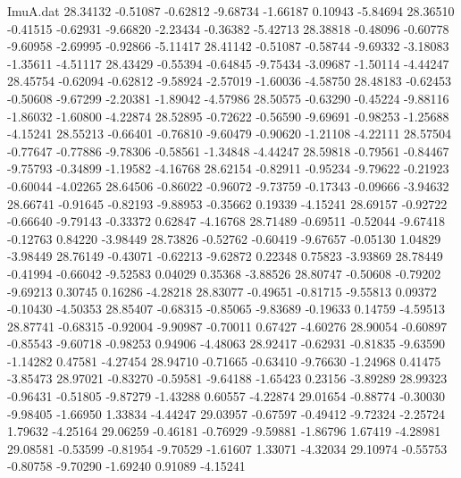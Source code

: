 \begin{filecontents}{ImuA.dat}
  28.34132   -0.51087   -0.62812   -9.68734   -1.66187    0.10943   -5.84694
  28.36510   -0.41515   -0.62931   -9.66820   -2.23434   -0.36382   -5.42713
  28.38818   -0.48096   -0.60778   -9.60958   -2.69995   -0.92866   -5.11417
  28.41142   -0.51087   -0.58744   -9.69332   -3.18083   -1.35611   -4.51117
  28.43429   -0.55394   -0.64845   -9.75434   -3.09687   -1.50114   -4.44247
  28.45754   -0.62094   -0.62812   -9.58924   -2.57019   -1.60036   -4.58750
  28.48183   -0.62453   -0.50608   -9.67299   -2.20381   -1.89042   -4.57986
  28.50575   -0.63290   -0.45224   -9.88116   -1.86032   -1.60800   -4.22874
  28.52895   -0.72622   -0.56590   -9.69691   -0.98253   -1.25688   -4.15241
  28.55213   -0.66401   -0.76810   -9.60479   -0.90620   -1.21108   -4.22111
  28.57504   -0.77647   -0.77886   -9.78306   -0.58561   -1.34848   -4.44247
  28.59818   -0.79561   -0.84467   -9.75793   -0.34899   -1.19582   -4.16768
  28.62154   -0.82911   -0.95234   -9.79622   -0.21923   -0.60044   -4.02265
  28.64506   -0.86022   -0.96072   -9.73759   -0.17343   -0.09666   -3.94632
  28.66741   -0.91645   -0.82193   -9.88953   -0.35662    0.19339   -4.15241
  28.69157   -0.92722   -0.66640   -9.79143   -0.33372    0.62847   -4.16768
  28.71489   -0.69511   -0.52044   -9.67418   -0.12763    0.84220   -3.98449
  28.73826   -0.52762   -0.60419   -9.67657   -0.05130    1.04829   -3.98449
  28.76149   -0.43071   -0.62213   -9.62872    0.22348    0.75823   -3.93869
  28.78449   -0.41994   -0.66042   -9.52583    0.04029    0.35368   -3.88526
  28.80747   -0.50608   -0.79202   -9.69213    0.30745    0.16286   -4.28218
  28.83077   -0.49651   -0.81715   -9.55813    0.09372   -0.10430   -4.50353
  28.85407   -0.68315   -0.85065   -9.83689   -0.19633    0.14759   -4.59513
  28.87741   -0.68315   -0.92004   -9.90987   -0.70011    0.67427   -4.60276
  28.90054   -0.60897   -0.85543   -9.60718   -0.98253    0.94906   -4.48063
  28.92417   -0.62931   -0.81835   -9.63590   -1.14282    0.47581   -4.27454
  28.94710   -0.71665   -0.63410   -9.76630   -1.24968    0.41475   -3.85473
  28.97021   -0.83270   -0.59581   -9.64188   -1.65423    0.23156   -3.89289
  28.99323   -0.96431   -0.51805   -9.87279   -1.43288    0.60557   -4.22874
  29.01654   -0.88774   -0.30030   -9.98405   -1.66950    1.33834   -4.44247
  29.03957   -0.67597   -0.49412   -9.72324   -2.25724    1.79632   -4.25164
  29.06259   -0.46181   -0.76929   -9.59881   -1.86796    1.67419   -4.28981
  29.08581   -0.53599   -0.81954   -9.70529   -1.61607    1.33071   -4.32034
  29.10974   -0.55753   -0.80758   -9.70290   -1.69240    0.91089   -4.15241

\end{filecontents}
